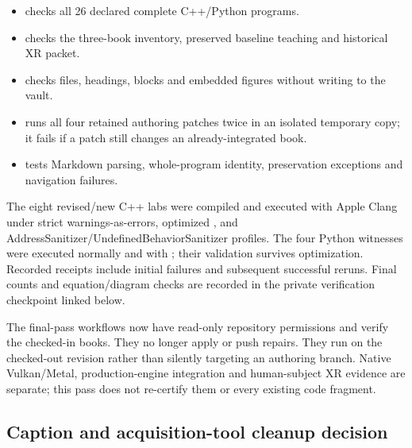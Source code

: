 \begin{itemize}
\tightlist
\item
   checks all 26 declared complete C++/Python programs.
\item
   checks the three-book inventory, preserved baseline teaching and historical XR packet.
\item
   checks files, headings, blocks and embedded figures without writing to the vault.
\item
   runs all four retained authoring patches twice in an isolated temporary copy; it fails if a patch still changes an already-integrated book.
\item
   tests Markdown parsing, whole-program identity, preservation exceptions and navigation failures.
\end{itemize}

The eight revised/new C++ labs were compiled and executed with Apple Clang under strict warnings-as-errors, optimized , and AddressSanitizer/UndefinedBehaviorSanitizer profiles. The four Python witnesses were executed normally and with ; their validation survives optimization. Recorded receipts include initial failures and subsequent successful reruns. Final counts and equation/diagram checks are recorded in the private verification checkpoint linked below.

The final-pass workflows now have read-only repository permissions and verify the checked-in books. They no longer apply or push repairs. They run on the checked-out revision rather than silently targeting an authoring branch. Native Vulkan/Metal, production-engine integration and human-subject XR evidence are separate; this pass does not re-certify them or every existing code fragment.

\subsection{Caption and acquisition-tool cleanup decision}\label{appendix-faa2b5a8e820-caption-and-acquisition-tool-cleanup-decision}

\hypertarget{appendix-faa2b5a8e820-caption-and-acquisition-tool-cleanup-decision}{}

